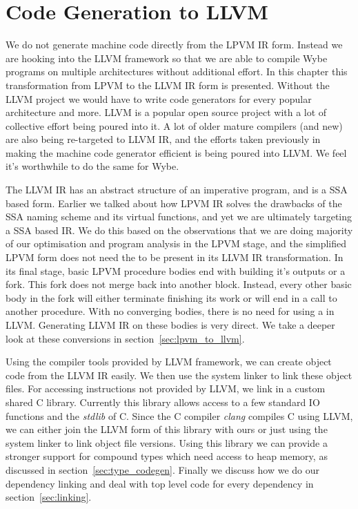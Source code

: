 \chapter{Code Generation to LLVM}
\label{chap:codegen_llvm}

We do not generate machine code directly from the LPVM IR form. Instead we are
hooking into the LLVM framework \citep{Lattner:MSThesis02} so that we are able
to compile Wybe programs on multiple architectures without additional
effort. In this chapter this transformation from LPVM to the LLVM IR form is
presented. Without the LLVM project we would have to write code generators for
every popular architecture and more. LLVM is a popular open source project with
a lot of collective effort being poured into it. A lot of older mature
compilers (and new) are also being re-targeted to LLVM IR, and the efforts
taken previously in making the machine code generator efficient is being poured
into LLVM. We feel it's worthwhile to do the same for Wybe.

The LLVM IR has an abstract structure of an imperative program, and is a SSA
based form. Earlier we talked about how LPVM IR solves the drawbacks of the SSA
naming scheme and its virtual functions, and yet we are ultimately targeting a
SSA based IR. We do this based on the observations that we are doing majority
of our optimisation and program analysis in the LPVM stage, and the simplified
LPVM form does not need the \phif to be present in its LLVM IR
transformation. In its final stage, basic LPVM procedure bodies end with
building it's outputs or a fork. This fork does not merge back into another
block. Instead, every other basic body in the fork will either terminate
finishing its work or will end in a call to another procedure. With no
converging bodies, there is no need for using a \phif in LLVM. Generating LLVM
IR on these bodies is very direct. We take a deeper look at these conversions
in section~\ref{sec:lpvm_to_llvm}.

Using the compiler tools provided by LLVM framework, we can create object code
from the LLVM IR easily. We then use the system linker to link these object
files. For accessing instructions not provided by LLVM, we link in a custom
shared C library. Currently this library allows access to a few standard IO
functions and the \textit{stdlib} of C. Since the C compiler \textit{clang}
compiles C using LLVM, we can either join the LLVM form of this library with
ours or just using the system linker to link object file versions. Using this
library we can provide a stronger support for compound types which need access
to heap memory, as discussed in section~\ref{sec:type_codegen}. Finally we
discuss how we do our dependency linking and deal with top level code for every
dependency in section~\ref{sec:linking}.


